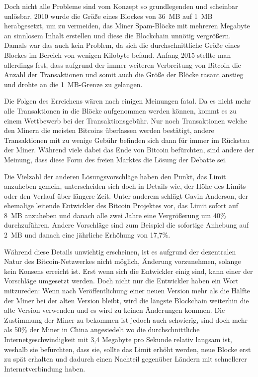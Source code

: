 Doch nicht alle Probleme sind vom Konzept so grundlegenden und scheinbar unlösbar.
2010 wurde die Größe eines Blockes von 36~MB auf 1~MB herabgesetzt, um zu vermeiden, das Miner Spam-Blöcke mit mehreren Megabyte an sinnlosem Inhalt erstellen und diese die Blockchain unnötig vergrößern.
Damals war das auch kein Problem, da sich die durchschnittliche Größe eines Blockes im Bereich von wenigen Kilobyte befand.
Anfang 2015 stellte man allerdings fest, dass aufgrund der immer weiteren Verbreitung von Bitcoin die Anzahl der Transaktionen und somit auch die Größe der Blöcke rasant anstieg und drohte an die 1~MB-Grenze zu gelangen.

Die Folgen des Erreichens wären nach einigen Meinungen fatal.
Da es nicht mehr alle Transaktionen in die Blöcke aufgenommen werden können, kommt es zu einem Wettbewerb bei der Transaktionsgebühr.
Nur noch Transaktionen welche den Minern die meisten Bitcoins überlassen werden bestätigt, andere Transaktionen mit zu wenige Gebühr befinden sich dann für immer im Rückstau der Miner.
Während viele dabei das Ende von Bitcoin befürchten, sind andere der Meinung, dass diese Form des freien Marktes die Lösung der Debatte sei.

Die Vielzahl der anderen Lösungsvorschläge haben den Punkt, das Limit anzuheben gemein, unterscheiden sich doch in Details wie, der Höhe des Limits oder den Verlauf über längere Zeit.
Unter anderem schlägt Gavin Anderson, der ehemalige leitende Entwickler des Bitcoin Projektes vor, das Limit sofort auf 8~MB anzuheben und danach alle zwei Jahre eine Vergrößerung um 40\% durchzuführen.
Andere Vorschläge sind zum Beispiel die sofortige Anhebung auf 2~MB und danach eine jährliche Erhöhung von 17,7\%.

Während diese Details unwichtig erscheinen, ist es aufgrund der dezentralen Natur des Bitcoin-Netzwerkes nicht möglich, Änderung vorzunehmen, solange kein Konsens erreicht ist.
Erst wenn sich die Entwickler einig sind, kann einer der Vorschläge umgesetzt werden.
Doch nicht nur die Entwickler haben ein Wort mitzureden:
Wenn nach Veröffentlichung einer neuen Version mehr als die Hälfte der Miner bei der alten Version bleibt, wird die längste Blockchain weiterhin die alte Version verwenden und es wird zu keinen Änderungen kommen.
Die Zustimmung der Miner zu bekommen ist jedoch auch schwierig, sind doch mehr als 50\% der Miner in China angesiedelt wo die durchschnittliche Internetgeschwindigkeit mit 3,4 Megabyte pro Sekunde  relativ langsam ist, weshalb sie befürchten, dass sie, sollte das Limit erhöht werden, neue Blocke erst zu spät erhalten und dadurch einen Nachteil gegenüber Ländern mit schnellerer Internetverbindung haben.

